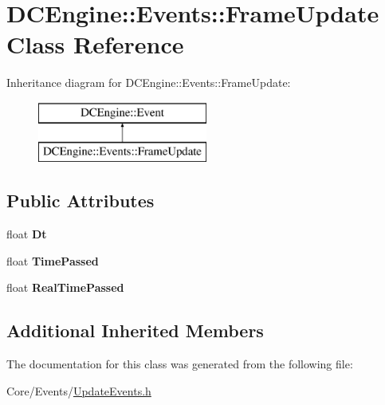 \hypertarget{classDCEngine_1_1Events_1_1FrameUpdate}{\section{D\-C\-Engine\-:\-:Events\-:\-:Frame\-Update Class Reference}
\label{classDCEngine_1_1Events_1_1FrameUpdate}
}
Inheritance diagram for D\-C\-Engine\-:\-:Events\-:\-:Frame\-Update\-:\begin{figure}[H]
\begin{center}
\leavevmode
\includegraphics[height=2.000000cm]{classDCEngine_1_1Events_1_1FrameUpdate}
\end{center}
\end{figure}
\subsection*{Public Attributes}
\begin{DoxyCompactItemize}
\item 
\hypertarget{classDCEngine_1_1Events_1_1FrameUpdate_a846a5288195e15f68cf72e26f34c4c81}{float {\bfseries Dt}}\label{classDCEngine_1_1Events_1_1FrameUpdate_a846a5288195e15f68cf72e26f34c4c81}

\item 
\hypertarget{classDCEngine_1_1Events_1_1FrameUpdate_a1b018ce35dafdfca696180b322fd1c9c}{float {\bfseries Time\-Passed}}\label{classDCEngine_1_1Events_1_1FrameUpdate_a1b018ce35dafdfca696180b322fd1c9c}

\item 
\hypertarget{classDCEngine_1_1Events_1_1FrameUpdate_a228d9432ff181c4f9489887a005b6792}{float {\bfseries Real\-Time\-Passed}}\label{classDCEngine_1_1Events_1_1FrameUpdate_a228d9432ff181c4f9489887a005b6792}

\end{DoxyCompactItemize}
\subsection*{Additional Inherited Members}


The documentation for this class was generated from the following file\-:\begin{DoxyCompactItemize}
\item 
Core/\-Events/\hyperlink{UpdateEvents_8h}{Update\-Events.\-h}\end{DoxyCompactItemize}
